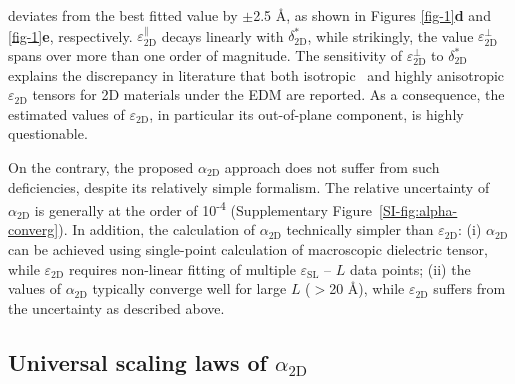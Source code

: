 deviates from the best fitted value by $\pm{}$2.5 \AA{}, as shown in
Figures \ref{fig-1}\textbf{d} and \ref{fig-1}\textbf{e},
respectively. $\varepsilon_{\mathrm{2D}}^{\parallel}$ decays linearly
with $\delta^{*}_{\mathrm{2D}}$,
while strikingly, the value $\varepsilon_{\mathrm{2D}}^{\perp}$ spans
over more than one order of magnitude. The sensitivity of
$\varepsilon_{\mathrm{2D}}^{\perp}$ to $\delta^{*}_{\mathrm{2D}}$
explains the discrepancy in literature that both
isotropic~\cite{Sohier_2016} and highly
anisotropic~\cite{Matthes_2016,Laturia_2018}
$\varepsilon_{\mathrm{2D}}$ tensors for 2D materials under the EDM are
reported. As a consequence, the estimated values of
$\varepsilon_{\mathrm{2D}}$, in particular its out-of-plane component,
is highly questionable.

On the contrary, the proposed $\alpha_{\mathrm{2D}}$ approach does not
suffer from such deficiencies, despite its relatively simple
formalism. The relative uncertainty of $\alpha_{\mathrm{2D}}$ is
generally at the order of 10\textsuperscript{-4} (Supplementary
Figure~\ref{SI-fig:alpha-converg}). In addition, the calculation of
$\alpha_{\mathrm{2D}}$ technically simpler than
$\varepsilon_{\mathrm{2D}}$: (i) $\alpha_{\mathrm{2D}}$ can be
achieved using single-point calculation of macroscopic dielectric
tensor, while $\varepsilon_{\mathrm{2D}}$ requires non-linear fitting
of multiple $\varepsilon_{\mathrm{SL}}$ -- $L$ data points; (ii) the
values of $\alpha_{\mathrm{2D}}$ typically converge well for large $L$
($>$20 \AA{}), while $\varepsilon_{\mathrm{2D}}$ suffers from the
uncertainty as described above.



\subsection{Universal scaling laws of $\alpha_{\mathrm{2D}}$}
\label{sec:univ-scal-laws}

